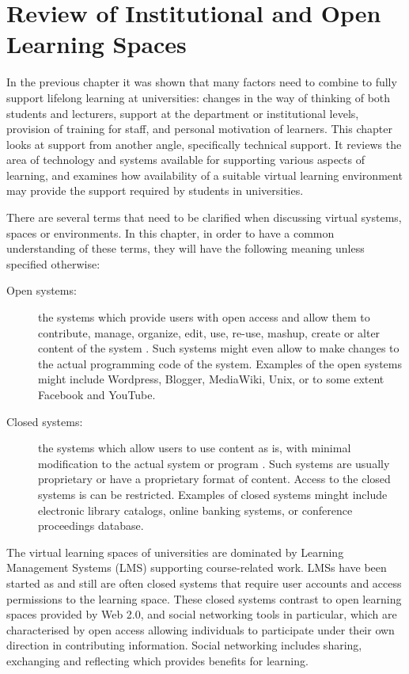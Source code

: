 \chapter{Review of Institutional and Open Learning Spaces \label{cha:systudy}}
In the previous chapter it was shown that many factors need to combine to fully
support lifelong learning at universities: changes in the way of thinking of
both students and lecturers, support at the department or institutional levels,
provision of training for staff, and personal motivation of learners. This
chapter looks at \LLLs support from another angle, specifically technical
support. It reviews the area of technology and systems available for supporting
various aspects of learning, and examines how availability of a suitable virtual
learning environment may provide the \LLLs support required by students in
universities.

There are several terms that need to be clarified when discussing virtual
systems, spaces or environments. In this chapter, in order to have a common
understanding of these terms, they will have the following meaning unless
specified otherwise:

\begin{description}
	\item[Open systems:] the systems which provide users with open access and allow
	them to contribute, manage, organize, edit, use, re-use, mashup, create or
	alter content of the system \citep{Fay2009}. Such systems might even allow to
	make changes to the actual programming code of the system. Examples of the open
	systems might include Wordpress, Blogger, MediaWiki, Unix, or to some extent
	Facebook and YouTube.
	\item[Closed systems:] the systems which allow users to use content as is, with
	minimal modification to the actual system or program \citep{Fay2009}. Such
	systems are usually proprietary or have a proprietary format of content. Access
	to the closed systems is can be restricted. Examples of closed systems
	minght include electronic library catalogs, online banking systems, or
	conference proceedings database.
\end{description}

The virtual learning spaces of universities are dominated by Learning Management
Systems (LMS) supporting course-related work. LMSs have been started as and
still are often closed systems that require user accounts and access permissions
to the learning space. These closed systems contrast to open learning spaces
provided by Web 2.0, and social networking tools in particular, which are
characterised by open access allowing individuals to participate under their own
direction in contributing information. Social networking includes sharing,
exchanging and reflecting which provides benefits for learning. 
 
